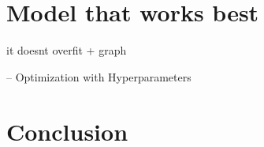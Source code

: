 \documentclass{article}
\begin{document}
  \section{Model that works best}\label{sec_themodel}
 
 it doesnt overfit + graph
 
 
 -- Optimization with Hyperparameters
  
 \section{Conclusion}\label{sec_conclusion}
 
 

 
  
  
  
\end{document}
